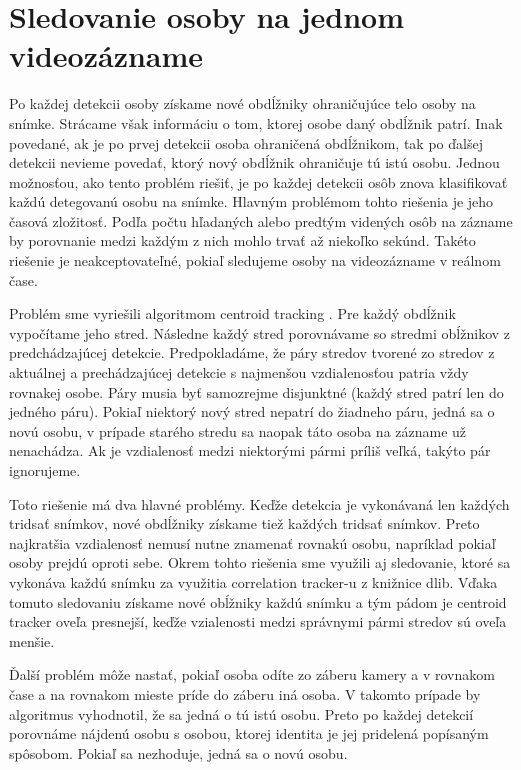 \section{Sledovanie osoby na jednom videozázname}
Po každej detekcii osoby získame nové obdĺžniky ohraničujúce telo osoby na snímke. 
Strácame však informáciu o tom, ktorej osobe daný obdĺžnik patrí.
Inak povedané, ak je po prvej detekcii osoba ohraničená obdĺžnikom, tak po ďalšej detekcii nevieme povedať, ktorý nový obdĺžnik ohraničuje tú istú osobu.
Jednou možnosťou, ako tento problém riešiť, je po každej detekcii osôb znova klasifikovať každú detegovanú osobu na snímke.
Hlavným problémom tohto riešenia je jeho časová zložitosť. 
Podľa počtu hľadaných alebo predtým videných osôb na zázname by porovnanie medzi každým z nich mohlo trvať až niekoľko sekúnd.
Takéto riešenie je neakceptovateľné, pokiaľ sledujeme osoby na videozázname v reálnom čase. 

Problém sme vyriešili algoritmom centroid tracking \cite{centroid}.
Pre každý obdĺžnik vypočítame jeho stred. 
Následne každý stred porovnávame so stredmi obĺžnikov z predchádzajúcej detekcie.
Predpokladáme, že páry stredov tvorené zo stredov z aktuálnej a prechádzajúcej detekcie s najmenšou vzdialenosťou patria vždy rovnakej osobe. 
Páry musia byť samozrejme disjunktné (každý stred patrí len do jedného páru).
Pokiaľ niektorý nový stred nepatrí do žiadneho páru, jedná sa o novú osobu, v prípade starého stredu sa naopak táto osoba na zázname už nenachádza.
Ak je vzdialenosť medzi niektorými pármi príliš veľká, takýto pár ignorujeme.

Toto riešenie má dva hlavné problémy.
Keďže detekcia je vykonávaná len každých tridsať snímkov, nové obdĺžniky získame tiež každých tridsať snímkov.
Preto najkratšia vzdialenosť nemusí nutne znamenať rovnakú osobu, napríklad pokiaľ osoby prejdú oproti sebe.
Okrem tohto riešenia sme využili aj sledovanie, ktoré sa vykonáva každú snímku za využitia correlation tracker-u z knižnice dlib.
Vďaka tomuto sledovaniu získame nové obĺžniky každú snímku a tým pádom je centroid tracker oveľa presnejší, keďže vzialenosti medzi správnymi pármi stredov sú oveľa menšie.

Ďalší problém môže nastať, pokiaľ osoba odíte zo záberu kamery a v rovnakom čase a na rovnakom mieste príde do záberu iná osoba.
V takomto prípade by algoritmus vyhodnotil, že sa jedná o tú istú osobu.
Preto po každej detekcií porovnáme nájdenú osobu s osobou, ktorej identita je jej pridelená popísaným spôsobom.
Pokiaľ sa nezhoduje, jedná sa o novú osobu.

